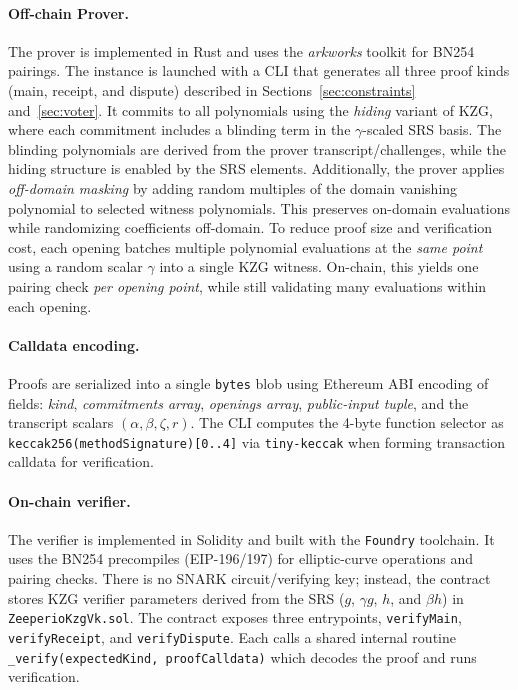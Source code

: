 \paragraph{Off-chain Prover.}
The prover is implemented in Rust and uses the \emph{arkworks} toolkit for BN254 pairings. 
The instance is launched with a CLI that generates all three proof kinds (main, receipt, and dispute) described in Sections~\ref{sec:constraints} and~\ref{sec:voter}.
It commits to all polynomials using the \emph{hiding} variant of KZG, where each commitment includes a blinding term in the $\gamma$-scaled SRS basis.
The blinding polynomials are derived from the prover transcript/challenges, while the hiding structure is enabled by the SRS elements.
Additionally, the prover applies \emph{off-domain masking} by adding random multiples of the domain vanishing polynomial to selected witness polynomials.
This preserves on-domain evaluations while randomizing coefficients off-domain.
To reduce proof size and verification cost, each opening batches multiple polynomial evaluations at the \emph{same point}
using a random scalar $\gamma$ into a single KZG witness. On-chain, this yields one pairing check \emph{per opening point},
while still validating many evaluations within each opening.

\paragraph{Calldata encoding.}
Proofs are serialized into a single \texttt{bytes} blob using Ethereum ABI encoding of fields:
\emph{kind}, \emph{commitments array}, \emph{openings array}, \emph{public-input tuple}, and the transcript scalars $(\alpha,\beta,\zeta,r)$.
The CLI computes the 4-byte function selector as \texttt{keccak256(methodSignature)[0..4]} via \texttt{tiny-keccak} when forming transaction calldata for verification.

\paragraph{On-chain verifier.}
The verifier is implemented in Solidity and built with the \texttt{Foundry} toolchain.
It uses the BN254 precompiles (EIP-196/197) for elliptic-curve operations and pairing checks.
There is no SNARK circuit/verifying key; instead, the contract stores KZG verifier parameters derived from the SRS
($g$, $\gamma g$, $h$, and $\beta h$) in \texttt{ZeeperioKzgVk.sol}.
The contract exposes three entrypoints, \texttt{verifyMain}, \texttt{verifyReceipt}, and \texttt{verifyDispute}.
Each calls a shared internal routine \texttt{\_verify(expectedKind, proofCalldata)} which decodes the proof and runs verification.

